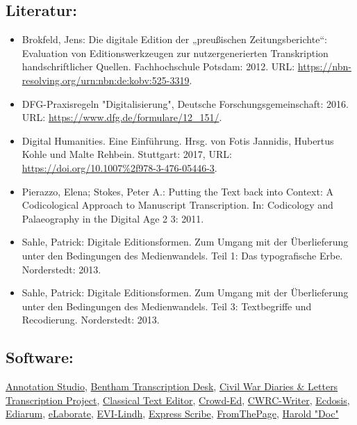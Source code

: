 \documentclass{article}
\begin{document}
        \subsection*{Literatur:}\begin{itemize}\item Brokfeld, Jens: Die digitale Edition der „preußischen Zeitungsberichte“:
                              Evaluation von Editionswerkzeugen zur nutzergenerierten Transkription
                              handschriftlicher Quellen. Fachhochschule Potsdam: 2012. URL: \url{https://nbn-resolving.org/urn:nbn:de:kobv:525-3319}.\item DFG-Praxisregeln "Digitalisierung", Deutsche Forschungsgemeinschaft: 2016. URL: \url{https://www.dfg.de/formulare/12_151/}.\item Digital Humanities. Eine Einführung. Hrsg. von Fotis Jannidis, Hubertus Kohle und Malte Rehbein. Stuttgart: 2017, URL: \url{https://doi.org/10.1007%2f978-3-476-05446-3}.\item Pierazzo, Elena; Stokes, Peter A.: Putting the Text back into Context: A Codicological
                              Approach to Manuscript Transcription. In: Codicology and Palaeography in the Digital Age 2 3: 2011.\item Sahle, Patrick: Digitale Editionsformen. Zum Umgang mit der
                              Überlieferung unter den Bedingungen des Medienwandels. Teil 1: Das
                              typografische Erbe. Norderstedt: 2013.\item Sahle, Patrick: Digitale Editionsformen. Zum Umgang mit der
                              Überlieferung unter den Bedingungen des Medienwandels. Teil 3:
                              Textbegriffe und Recodierung. Norderstedt: 2013.\end{itemize}\subsection*{Software:}\href{https://www.annotationstudio.org/}{Annotation
                           Studio}, \href{http://transcribe-bentham.ucl.ac.uk/td/Transcribe_Bentham}{Bentham Transcription Desk}, \href{https://diyhistory.lib.uiowa.edu}{Civil War
                           Diaries & Letters Transcription Project}, \href{http://cte.oeaw.ac.at/}{Classical Text
                           Editor}, \href{https://github.com/gsbodine/crowd-ed}{Crowd-Ed}, \href{https://wiki.tei-c.org/index.php/CWRC-Writer}{CWRC-Writer}, \href{https://ecdosis.rocks/Home/}{Ecdosis}, \href{http://www.bbaw.de/telota/software/ediarum}{Ediarum}, \href{https://www.e-laborate.nl/en/}{eLaborate}, \href{http://linhd.es/en/}{EVI-Lindh}, \href{https://www.nch.com.au/scribe/index.html}{Express Scribe}, \href{https://fromthepage.com/}{FromThePage}, \href{http://edgerton-digital-collections.org/notebooks}{Harold "Doc"
}
\end{document}
